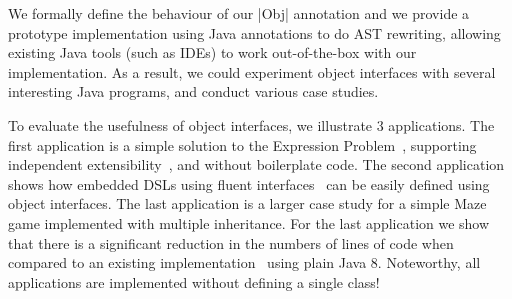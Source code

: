 We formally define the behaviour of our \Q|Obj| annotation and we provide a
prototype
implementation using Java annotations to do AST
rewriting, allowing existing Java tools (such as IDEs) to work
out-of-the-box with our implementation. As a result, we could
experiment object interfaces with several interesting Java programs,
and conduct various case studies.


To evaluate the usefulness of object interfaces, we illustrate 3
applications. The first application is a simple 
solution to the Expression Problem~\cite{wadler98expression}, supporting independent 
extensibility~\cite{zenger05independentlyextensible}, and without boilerplate code. The second
application shows how embedded DSLs using fluent interfaces~\cite{fowler2005fluentinterface} 
can be easily defined using object interfaces. The last
application is a larger case study for a simple Maze game implemented with 
multiple inheritance. For the last application we show that there is a
significant reduction in the numbers of lines of code when compared 
to an existing implementation~\cite{bono14} using plain Java 8. 
Noteworthy, all applications are implemented 
without defining a single class!

